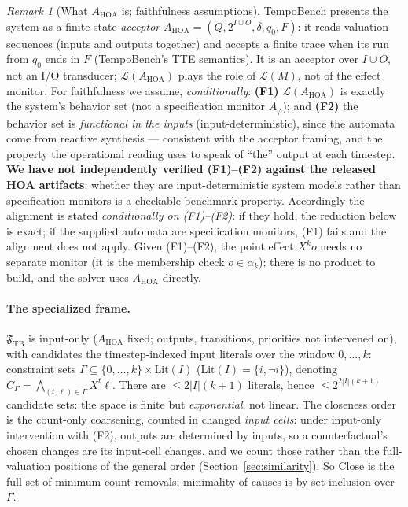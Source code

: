 \documentclass[11pt]{article}
\theoremstyle{remark}
\newtheorem{remark}{Remark}
\newcommand{\Close}{\mathrm{Close}}
\newcommand{\Lang}{\mathcal{L}}
\newcommand{\Frame}{\mathfrak{F}}
\begin{document}
\begin{remark}[What \(A_{\mathrm{HOA}}\) is; faithfulness assumptions]
\label{rem:hoa}
TempoBench presents the system as a finite-state \emph{acceptor}
\(A_{\mathrm{HOA}}=(Q,2^{I\cup O},\delta,q_0,F)\): it reads valuation sequences
(inputs and outputs together) and accepts a finite trace when its run from \(q_0\)
ends in \(F\) (TempoBench's TTE semantics). It is an acceptor over \(I\cup O\),
not an I/O transducer; \(\Lang(A_{\mathrm{HOA}})\) plays the role of \(\Lang(M)\),
not of the effect monitor. For faithfulness we assume, \emph{conditionally}:
\textbf{(F1)} \(\Lang(A_{\mathrm{HOA}})\) is exactly the system's behavior set
(not a specification monitor \(A_\varphi\)); and \textbf{(F2)} the behavior set is
\emph{functional in the inputs} (input-deterministic), since the automata come
from reactive synthesis --- consistent with the acceptor framing, and the property
the operational reading uses to speak of ``the'' output at each timestep.
\textbf{We have not independently verified (F1)--(F2) against the released HOA
artifacts}; whether they are input-deterministic system models rather than
specification monitors is a checkable benchmark property. Accordingly the
alignment is stated \emph{conditionally on (F1)--(F2)}: if they hold, the reduction
below is exact; if the supplied automata are specification monitors, (F1) fails and
the alignment does not apply. Given (F1)--(F2), the point effect \(X^k o\) needs no
separate monitor (it is the membership check \(o\in\alpha_k\)); there is no product
to build, and the solver uses \(A_{\mathrm{HOA}}\) directly.
\end{remark}

\paragraph{The specialized frame.} \(\Frame_{\mathrm{TB}}\) is input-only
(\(A_{\mathrm{HOA}}\) fixed; outputs, transitions, priorities not intervened on),
with candidates the timestep-indexed input literals over the window
\(0,\ldots,k\): constraint sets \(\Gamma\subseteq\{0,\ldots,k\}\times
\mathrm{Lit}(I)\) (\(\mathrm{Lit}(I)=\{i,\neg i\}\)), denoting
\(C_\Gamma=\bigwedge_{(t,\ell)\in\Gamma}X^t\ell\). There are \(\le 2|I|(k+1)\)
literals, hence \(\le 2^{2|I|(k+1)}\) candidate sets: the space is finite but
\emph{exponential}, not linear. The closeness order is the count-only coarsening,
counted in changed \emph{input cells}: under input-only intervention with (F2),
outputs are determined by inputs, so a counterfactual's chosen changes are its
input-cell changes, and we count those rather than the full-valuation positions of
the general order (Section~\ref{sec:similarity}). So \(\Close\) is the full set of
minimum-count removals; minimality of causes is by set inclusion over \(\Gamma\).
\end{document}

